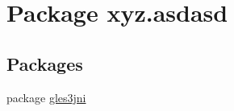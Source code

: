 \hypertarget{namespacexyz_1_1asdasd}{}\section{Package xyz.\+asdasd}
\label{namespacexyz_1_1asdasd}
\subsection*{Packages}
\begin{DoxyCompactItemize}
\item 
package \hyperlink{namespacexyz_1_1asdasd_1_1gles3jni}{gles3jni}
\end{DoxyCompactItemize}
